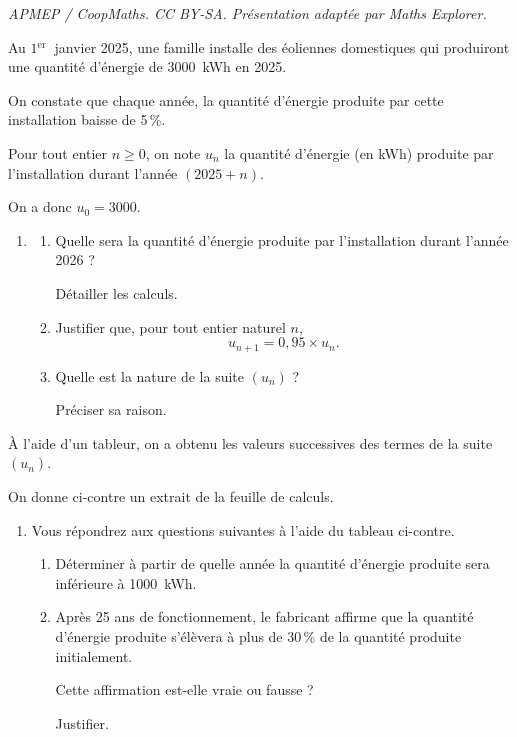 \documentclass[10pt]{article}
\providecommand{\np}[2][]{{#2~#1}}
\begin{document}
\noindent\textit{APMEP / CoopMaths. CC BY-SA. Présentation adaptée par Maths Explorer.}\par\medskip
\begin{minipage}[t]{0.6\linewidth}
	Au $1{ }^{\text {er }}$ janvier 2025, une famille installe des éoliennes domestiques qui produiront une quantité d'énergie de \np[kWh]{3000} en 2025.

	On constate que chaque année, la quantité d'énergie produite par cette installation baisse de 5\,\%.

	Pour tout entier $n \geqslant  0$, on note $u_{n}$ la quantité d'énergie (en kWh) produite par l'installation durant l'année $(2025+n)$.

	On a donc $u_{0}=3000$.

	\begin{enumerate}
		\item \begin{enumerate}
			\item Quelle sera la quantité d'énergie produite par l'installation durant l'année 2026 ?

			Détailler les calculs.

			\item Justifier que, pour tout entier naturel $n$,
			\[u_{n+1}=0,95 \times u_{n}.\]

			\item Quelle est la nature de la suite $(u_{n})$ ?

			Préciser sa raison.
		\end{enumerate}
	\end{enumerate}

	À l'aide d'un tableur, on a obtenu les valeurs successives des termes de la suite $(u_{n})$.

	On donne ci-contre un extrait de la feuille de calculs.

	\begin{enumerate}[resume]
		\item Vous répondrez aux questions suivantes à l'aide du tableau ci-contre.

		\begin{enumerate}
			\item Déterminer à partir de quelle année la quantité d'énergie produite sera inférieure à \np[kWh]{1000}.

			\item Après 25 ans de fonctionnement, le fabricant affirme que la quantité d'énergie produite s'élèvera à plus de $30\,\%$ de la quantité produite initialement.

			Cette affirmation est-elle vraie ou fausse ?

			Justifier.
		\end{enumerate}
	\end{enumerate}
	\end{minipage}
\end{document}
